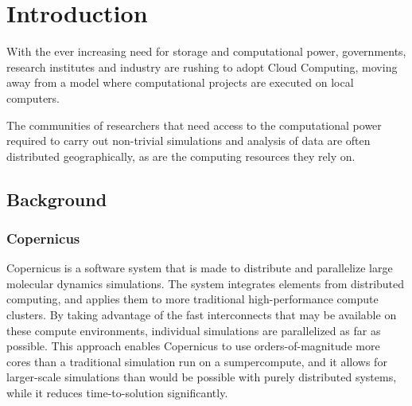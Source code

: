 \chapter{Introduction}
With the ever increasing need for storage and computational power,
governments, research institutes and industry are rushing to adopt
Cloud Computing, moving away from a model where computational projects
are executed on local computers.

The communities of researchers that need access to the computational
power required to carry out non-trivial simulations and analysis of
data are often distributed geographically, as are the computing
resources they rely on.

\section{Background}




\subsection{Copernicus}
Copernicus is a software system that is made to distribute and
parallelize large molecular dynamics simulations. The system
integrates elements from distributed computing, and applies them to
more traditional high-performance compute clusters. By taking
advantage of the fast interconnects that may be available on these
compute environments, individual simulations are parallelized as far
as possible. This approach enables Copernicus to use
orders-of-magnitude more cores than a traditional simulation run on a
sumpercompute, and it allows for larger-scale simulations than would
be possible with purely distributed systems, while it reduces
time-to-solution significantly.


